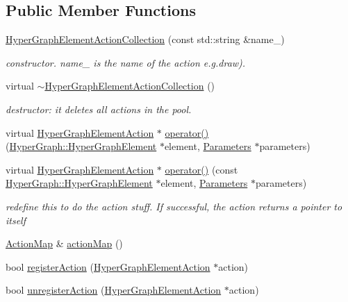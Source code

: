 \subsection*{Public Member Functions}
\begin{DoxyCompactItemize}
\item 
\mbox{\hyperlink{classg2o_1_1_hyper_graph_element_action_collection_a6af1ca2dfcdc0894eb594c68135dd614}{Hyper\+Graph\+Element\+Action\+Collection}} (const std\+::string \&name\+\_\+)
\begin{DoxyCompactList}\small\item\em constructor. name\+\_\+ is the name of the action e.\+g.\+draw). \end{DoxyCompactList}\item 
virtual \mbox{\hyperlink{classg2o_1_1_hyper_graph_element_action_collection_ad55fc899922f91c1446d9d69f343c7ab}{$\sim$\+Hyper\+Graph\+Element\+Action\+Collection}} ()
\begin{DoxyCompactList}\small\item\em destructor\+: it deletes all actions in the pool. \end{DoxyCompactList}\item 
virtual \mbox{\hyperlink{classg2o_1_1_hyper_graph_element_action}{Hyper\+Graph\+Element\+Action}} $\ast$ \mbox{\hyperlink{classg2o_1_1_hyper_graph_element_action_collection_a1388f0d6629501c1b80035f80c56efbe}{operator()}} (\mbox{\hyperlink{structg2o_1_1_hyper_graph_1_1_hyper_graph_element}{Hyper\+Graph\+::\+Hyper\+Graph\+Element}} $\ast$element, \mbox{\hyperlink{structg2o_1_1_hyper_graph_element_action_1_1_parameters}{Parameters}} $\ast$parameters)
\item 
virtual \mbox{\hyperlink{classg2o_1_1_hyper_graph_element_action}{Hyper\+Graph\+Element\+Action}} $\ast$ \mbox{\hyperlink{classg2o_1_1_hyper_graph_element_action_collection_a4cb9b20a8b1aac8eb018ef6fc4ec0dfc}{operator()}} (const \mbox{\hyperlink{structg2o_1_1_hyper_graph_1_1_hyper_graph_element}{Hyper\+Graph\+::\+Hyper\+Graph\+Element}} $\ast$element, \mbox{\hyperlink{structg2o_1_1_hyper_graph_element_action_1_1_parameters}{Parameters}} $\ast$parameters)
\begin{DoxyCompactList}\small\item\em redefine this to do the action stuff. If successful, the action returns a pointer to itself \end{DoxyCompactList}\item 
\mbox{\hyperlink{classg2o_1_1_hyper_graph_element_action_abc889fc90ae1bbb63d90c7993777417a}{Action\+Map}} \& \mbox{\hyperlink{classg2o_1_1_hyper_graph_element_action_collection_a26d57ddd0079ed7181fbb322c9a8106c}{action\+Map}} ()
\item 
bool \mbox{\hyperlink{classg2o_1_1_hyper_graph_element_action_collection_a9eb641e9c9bb22f3540dc98c2c750ea9}{register\+Action}} (\mbox{\hyperlink{classg2o_1_1_hyper_graph_element_action}{Hyper\+Graph\+Element\+Action}} $\ast$action)
\item 
bool \mbox{\hyperlink{classg2o_1_1_hyper_graph_element_action_collection_a6dc646c0dd8fbf9b54fb8161348af5e6}{unregister\+Action}} (\mbox{\hyperlink{classg2o_1_1_hyper_graph_element_action}{Hyper\+Graph\+Element\+Action}} $\ast$action)
\end{DoxyCompactItemize}
